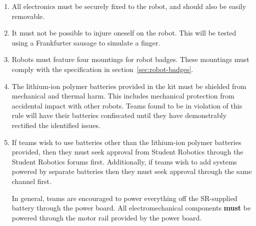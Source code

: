 \begin{enumerate}
\item All electronics must be securely fixed to the robot, and should also be easily removable.

\item It must not be possible to injure oneself on the robot.
 This will be tested using a Frankfurter sausage to simulate a finger.

\item Robots must feature four mountings for robot badges.  These mountings must comply with the specification in section~\ref{sec:robot-badges}.

\item The lithium-ion polymer batteries provided in the kit must be shielded from mechanical and thermal harm.  This includes mechanical protection from accidental impact with other robots.  Teams found to be in violation of this rule will have their batteries confiscated until they have demonstrably rectified the identified issues.

\item If teams wish to use batteries other than the lithium-ion polymer batteries provided, then they must seek approval from Student Robotics through the Student Robotics forums first.  Additionally, if teams wish to add systems powered by separate batteries then they must seek approval through the same channel first.

 In general, teams are encouraged to power everything off the SR-supplied battery through the power board.
 All electromechanical components \textbf{must} be powered through the motor rail provided by the power board.


\end{enumerate}
